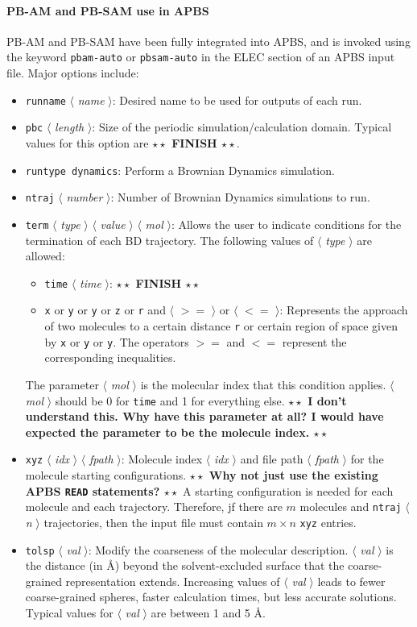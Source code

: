 \documentclass[11pt,titlepage]{article}
\newcommand{\todo}[1]{\textbf{$\star \star$ {#1} $\star \star$}}
\newcommand{\keyword}[1]{\texttt{#1}}
\newcommand{\param}[1]{$\langle$ \textit{#1} $\rangle$}
\begin{document}
\paragraph{PB-AM and PB-SAM use in APBS}
PB-AM and PB-SAM have been fully integrated into APBS, and is invoked using the keyword \keyword{pbam-auto} or \keyword{pbsam-auto} in the ELEC section of an APBS input file.
Major options include:
\begin{itemize}
	\item \keyword{runname} \param{name}: Desired name to be used for outputs of each run.
	\item \keyword{pbc} \param{length}:  Size of the periodic simulation/calculation domain.
	Typical values for this option are \todo{FINISH}.
	\item \keyword{runtype dynamics}:  Perform a Brownian Dynamics simulation.
	\item \keyword{ntraj} \param{number}:  Number of Brownian Dynamics simulations to run. 
	\item \keyword{term} \param{type} \param{value} \param{mol}:  Allows the user to indicate conditions for the termination of each BD trajectory.
	The following values of \param{type} are allowed:
	\begin{itemize}
		\item \keyword{time} \param{time}: \todo{FINISH}
		\item \keyword{x} or \keyword{y} or \keyword{y} or \keyword{z} or \keyword{r} and \param{$>=$} or \param{$<=$}: Represents the approach of two molecules to a certain distance \keyword{r} or certain region of space given by \keyword{x} or \keyword{y} or \keyword{y}.
		The operators $>=$ and $<=$ represent the corresponding inequalities.
	\end{itemize}
	The parameter \param{mol} is the molecular index that this condition applies.  \param{mol} should be 0 for \keyword{time} and 1 for everything else.
	\todo{I don't understand this. Why have this parameter at all?  I would have expected the parameter to be the molecule index.}
	\item \keyword{xyz} \param{idx} \param{fpath}:  Molecule index \param{idx} and file path \param{fpath} for the molecule starting configurations. \todo{Why not just use the existing APBS \keyword{READ} statements?}
	A starting configuration is needed for each molecule and each trajectory.
	Therefore, jf there are $m$ molecules and \keyword{ntraj} \param{n} trajectories, then the input file must contain $m \times n$ \keyword{xyz} entries.
	\item \keyword{tolsp} \param{val}: Modify the coarseness of the molecular description.
	\param{val} is the distance (in \AA) beyond the solvent-excluded surface that the coarse-grained representation extends.
	Increasing values of \param{val} leads to fewer coarse-grained spheres, faster calculation times, but less accurate solutions.
	Typical values for \param{val} are between 1 and 5 \AA.
\end{itemize}
\end{document}
